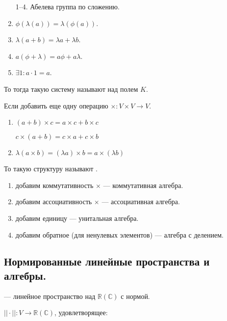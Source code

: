 \begin{enumerate}
    \item[1--4.] Абелева группа по сложению.
    \setcounter{enumi}{4}
    \item $ \phi(\lambda(a)) = \lambda(\phi(a))$.
    \item $\lambda (a+b) = \lambda a + \lambda b$.
    \item $a ( \phi + \lambda) = a\phi + a \lambda $.
    \item $\exists 1: a \cdot 1 =a$.
\end{enumerate}

То тогда такую систему называют  над полем $K$.

Если добавить еще одну операцию $\times: V \times V \rightarrow V$.

\begin{enumerate}[resume]
    \item $(a+b)\times c = a \times c + b \times c $

          $c\times (a+b) = c \times a + c \times b$

    \item $\lambda (a \times b) = (\lambda a )\times b = a \times (\lambda b)$
\end{enumerate}

То такую структуру называют .

\begin{enumerate}[resume]
    \item добавим коммутативность $\times$ --- коммутативная алгебра.

    \item добавим ассоциативность $\times$ --- ассоциативная алгебра.

    \item добавим единицу --- унитальная алгебра.

    \item добавим обратное (для ненулевых элементов) --- алгебра с делением.
\end{enumerate}

\subsection{Нормированные линейные пространства и алгебры.}

 --- линейное пространство над $\mathbb{R}(\mathbb{C})$ с нормой.

 $||\cdot||:V \rightarrow \mathbb{R}(\mathbb{C})$, удовлетворящее:

